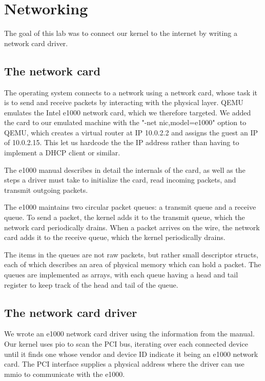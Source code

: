 \documentclass{report}
\begin{document}
\chapter{Networking}
The goal of this lab was to connect our kernel to the internet by writing a
network card driver.

\section{The network card}
The operating system connects to a network using a network card, whose task it
is to send and receive packets by interacting with the physical layer. QEMU
emulates the Intel e1000 network card, which we therefore targeted. We added
the card to our emulated machine with the "-net nic,model=e1000" option to
QEMU, which creates a virtual router at IP 10.0.2.2 and assigns the guest an
IP of 10.0.2.15. This let us hardcode the the IP address rather than having to
implement a DHCP client or similar.

The e1000 manual describes in detail the internals of the card, as well as the
steps a driver must take to initialize the card, read incoming packets, and
transmit outgoing packets. 

The e1000 maintains two circular packet queues: a transmit queue and a receive
queue. To send a packet, the kernel adds it to the transmit queue, which the
network card periodically drains. When a packet arrives on the wire, the
network card adds it to the receive queue, which the kernel periodically
drains.

The items in the queues are not raw packets, but rather small descriptor
structs, each of which describes an area of physical memory which can hold a
packet. The queues are implemented as arrays, with each queue having a head
and tail register to keep track of the head and tail of the queue.



\section{The network card driver}
We wrote an e1000 network card driver using the information from the manual.
Our kernel uses \gls{pio} to scan the PCI bus, iterating over each connected
device until it finds one whose vendor and device ID indicate it being an
e1000 network card. The PCI interface supplies a physical address where the
driver can use \gls{mmio} to communicate with the e1000.
\end{document}
